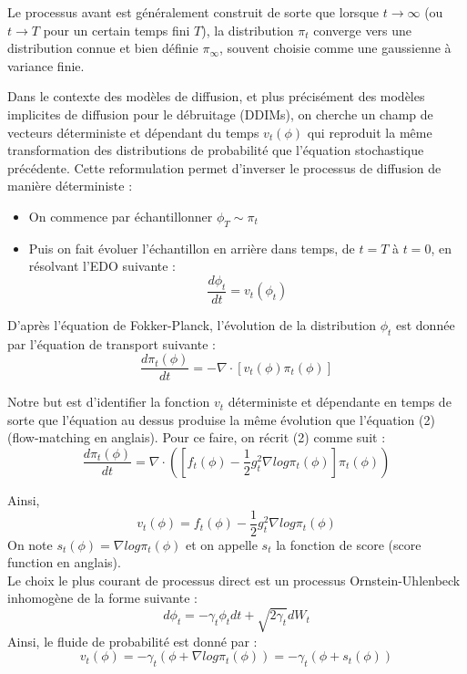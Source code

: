 \documentclass[a4paper,10pt]{article}
\theoremstyle{definition} %
\theoremstyle{definition} %
\theoremstyle{definition} %
\theoremstyle{definition} %
\begin{document}
Le processus avant est généralement construit de sorte que lorsque $t \rightarrow \infty$ (ou $t \rightarrow T$ pour un certain temps fini $T$), la distribution $\pi_t$ converge vers une distribution connue et bien définie $\pi_{\infty}$, souvent choisie comme une gaussienne à variance finie.

Dans le contexte des modèles de diffusion, et plus précisément des modèles implicites de diffusion pour le débruitage (DDIMs), on cherche un champ de vecteurs déterministe et dépendant du temps $v_t(\phi)$ qui reproduit la même transformation des distributions de probabilité que l'équation stochastique précédente. Cette reformulation permet d'inverser le processus de diffusion de manière déterministe :
\begin{itemize}
    \item On commence par échantillonner $\phi_T \sim \pi_t$
    \item Puis on fait évoluer l'échantillon en arrière dans temps, de $t=T$ à $t = 0$, en résolvant l'EDO suivante :
    \begin{equation}
        \frac{d\phi_t}{dt} = v_t(\phi_t)
    \end{equation}
\end{itemize}

D'après l'équation de Fokker-Planck, l'évolution de la distribution $\phi_t$ est donnée par l'équation de transport suivante :
\[\frac{d\pi_t(\phi)}{dt} =-\nabla \cdot [v_t(\phi)\pi_t(\phi)]\]

Notre but est d'identifier la fonction $v_t$ déterministe et dépendante en temps de sorte que l'équation au dessus produise la même évolution que l'équation (2) (flow-matching en anglais). Pour ce faire, on récrit (2) comme suit :
\[\frac{d\pi_t(\phi)}{dt} =\nabla \cdot([f_t(\phi)-\frac{1}{2}g_t^2\nabla log\pi_t(\phi)]\pi_t(\phi))\]

Ainsi,
\[v_t(\phi) =f_t(\phi)-\frac{1}{2}g_t^2\nabla log\pi_t(\phi) \]
On note $s_t(\phi) = \nabla log\pi_t(\phi)$ et on appelle $s_t$ la fonction de score (score function en anglais).\\

Le choix le plus courant de processus direct est un processus Ornstein-Uhlenbeck inhomogène de la forme suivante :
\[d\phi_t = -\gamma_t\phi_tdt + \sqrt{2\gamma_t}dW_t\]
Ainsi, le fluide de probabilité est donné par :
\[v_t(\phi) = -\gamma_t(\phi+\nabla log \pi_t(\phi)) = -\gamma_t(\phi+s_t(\phi))\]



 
\end{document}
